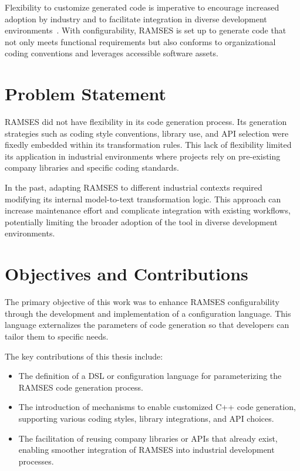 Flexibility to customize generated code is imperative to encourage increased adoption by industry and to facilitate integration in diverse development environments~\cite{Mikova_2025}. With configurability, \gls{RAMSES} is set up to generate code that not only meets functional requirements but also conforms to organizational coding conventions and leverages accessible software assets.

\section{Problem Statement}

\gls{RAMSES} did not have flexibility in its code generation process. Its generation strategies such as coding style conventions, library use, and \gls{API} selection were fixedly embedded within its transformation rules. This lack of flexibility limited its application in industrial environments where projects rely on pre-existing company libraries and specific coding standards.

In the past, adapting \gls{RAMSES} to different industrial contexts required modifying its internal model-to-text transformation logic. This approach can increase maintenance effort and complicate integration with existing workflows, potentially limiting the broader adoption of the tool in diverse development environments. 


\section{Objectives and Contributions}
\label{sec:obj_and_contrib}

The primary objective of this work was to enhance \gls{RAMSES} configurability through the development and implementation of a configuration language. This language externalizes the parameters of code generation so that developers can tailor them to specific needs.

The key contributions of this thesis include:
\begin{itemize}
	\item The definition of a \gls{DSL} or configuration language for parameterizing the \gls{RAMSES} code generation process.
	\item The introduction of mechanisms to enable customized C++ code generation, supporting various coding styles, library integrations, and \gls{API} choices.
	\item The facilitation of reusing company libraries or \gls{API}s that already exist, enabling smoother integration of \gls{RAMSES} into industrial development processes.
\end{itemize}

